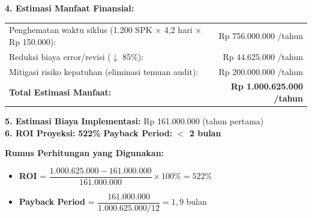 \documentclass[12pt,a4paper]{report}
\begin{document}
\begin{tcolorbox}[colback=fillgreen, colframe=plnblue, sharp corners, title={\bfseries Business Case 1 Halaman}]
\vspace{0.2cm}
\noindent\textbf{4. Estimasi Manfaat Finansial:}\\[0.2cm]
\begin{tabularx}{\textwidth}{@{} X r @{}}
Penghematan waktu siklus (1.200 SPK $\times$ 4,2 hari $\times$ Rp 150.000): & Rp 756.000.000 /tahun \\[0.2cm]
Reduksi biaya error/revisi ($\downarrow$ 85\%): & Rp 44.625.000 /tahun \\[0.2cm]
Mitigasi risiko kepatuhan (eliminasi temuan audit): & Rp 200.000.000 /tahun \\[0.2cm]
\textbf{Total Estimasi Manfaat:} & \textbf{Rp 1.000.625.000 /tahun} \\
\end{tabularx}

\vspace{0.2cm}
\noindent\textbf{5. Estimasi Biaya Implementasi:} Rp 161.000.000 (tahun pertama)\\[0.2cm]
\noindent\textbf{6. ROI Proyeksi:} \textbf{522\%} \quad \textbf{Payback Period:} \textbf{$<$ 2 bulan}

\end{tcolorbox}

\vspace{0.3cm}

\begin{tipbox}
\textbf{Rumus Perhitungan yang Digunakan:}
\begin{itemize}
    \item \textbf{ROI} = $\dfrac{1.000.625.000 - 161.000.000}{161.000.000} \times 100\% = 522\%$
    \item \textbf{Payback Period} = $\dfrac{161.000.000}{1.000.625.000 / 12} = 1,9$ bulan
\end{itemize}
\end{tipbox}

\vspace{0.3cm}
\end{document}
